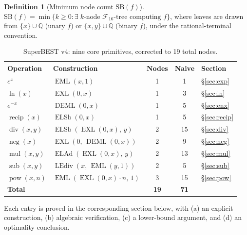 \documentclass[12pt,a4paper]{article}
\theoremstyle{definition}
\newtheorem{definition}[theorem]{Definition}
\newcommand{\EML}{\operatorname{EML}}
\newcommand{\EXL}{\operatorname{EXL}}
\newcommand{\DEML}{\operatorname{DEML}}
\newcommand{\ELAd}{\operatorname{ELAd}}
\newcommand{\ELSb}{\operatorname{ELSb}}
\newcommand{\LEdiv}{\operatorname{LEdiv}}
\newcommand{\recip}{\operatorname{recip}}
\newcommand{\divop}{\operatorname{div}}
\newcommand{\mulop}{\operatorname{mul}}
\newcommand{\subop}{\operatorname{sub}}
\newcommand{\negop}{\operatorname{neg}}
\newcommand{\powop}{\operatorname{pow}}
\newcommand{\SB}{\mathrm{SB}}
\newcommand{\F}{\mathcal{F}_{16}}
\begin{document}
\begin{definition}[Minimum node count $\SB(f)$]
\label{def:SB}
$\SB(f) = \min\{k \ge 0 : \exists\;\text{$k$-node $\F$-tree computing $f$}\}$,
where leaves are drawn from $\{x\}\cup\mathbb{Q}$ (unary $f$) or
$\{x,y\}\cup\mathbb{Q}$ (binary $f$), under the rational-terminal convention.
\end{definition}

\begin{table}[h]
\centering
\caption{SuperBEST v4: nine core primitives, corrected to 19 total nodes.}
\label{tab:superBEST}
\smallskip
\begin{tabular}{@{}llccl@{}}
\toprule
\textbf{Operation} & \textbf{Construction} & \textbf{Nodes} & \textbf{Naive} & \textbf{Section} \\
\midrule
$e^x$             & $\EML(x,1)$                          & 1  & 1  & \S\ref{sec:exp} \\
$\ln(x)$          & $\EXL(0,x)$                          & 1  & 3  & \S\ref{sec:ln} \\
$e^{-x}$          & $\DEML(0,x)$                         & 1  & 5  & \S\ref{sec:enx} \\
$\recip(x)$       & $\ELSb(0,x)$                         & 1  & 5  & \S\ref{sec:recip} \\
$\divop(x,y)$     & $\ELSb(\EXL(0,x),\,y)$              & 2  & 15 & \S\ref{sec:div} \\
$\negop(x)$       & $\EXL(0,\,\DEML(0,x))$              & 2  & 9  & \S\ref{sec:neg} \\
$\mulop(x,y)$     & $\ELAd(\EXL(0,x),\,y)$              & 2  & 13 & \S\ref{sec:mul} \\
$\subop(x,y)$     & $\LEdiv(x,\,\EML(y,1))$             & 2  & 5  & \S\ref{sec:sub} \\
$\powop(x,n)$     & $\EML(\EXL(0,x)\cdot n,\,1)$        & 3  & 15 & \S\ref{sec:pow} \\
\midrule
\textbf{Total}    &                                       & \textbf{19} & \textbf{71} & \\
\bottomrule
\end{tabular}
\smallskip

\end{table}

Each entry is proved in the corresponding section below, with
(a) an explicit construction, (b) algebraic verification, (c) a lower-bound
argument, and (d) an optimality conclusion.
\end{document}
